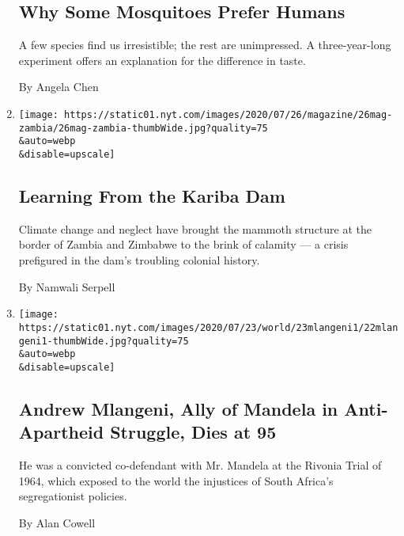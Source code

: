 \begin{enumerate}
  \hypertarget{why-some-mosquitoes-prefer-humans}{%
  \subsection{Why Some Mosquitoes Prefer
  Humans}\label{why-some-mosquitoes-prefer-humans}}

  A few species find us irresistible; the rest are unimpressed. A
  three-year-long experiment offers an explanation for the difference in
  taste.

  By Angela Chen
\item
  \href{/interactive/2020/07/22/magazine/zambia-kariba-dam.html}{}

  \texttt{[image: https://static01.nyt.com/images/2020/07/26/magazine/26mag-zambia/26mag-zambia-thumbWide.jpg?quality=75\\\&auto=webp\\\&disable=upscale]}

  \hypertarget{learning-from-the-kariba-dam}{%
  \subsection{Learning From the Kariba
  Dam}\label{learning-from-the-kariba-dam}}

  Climate change and neglect have brought the mammoth structure at the
  border of Zambia and Zimbabwe to the brink of calamity --- a crisis
  prefigured in the dam's troubling colonial history.

  By Namwali Serpell
\item
  \href{/2020/07/22/world/africa/andrew-mlangeni-dead.html}{}

  \texttt{[image: https://static01.nyt.com/images/2020/07/23/world/23mlangeni1/22mlangeni1-thumbWide.jpg?quality=75\\\&auto=webp\\\&disable=upscale]}

  \hypertarget{andrew-mlangeni-ally-of-mandela-in-anti-apartheid-struggle-dies-at-95}{%
  \subsection{Andrew Mlangeni, Ally of Mandela in Anti-Apartheid
  Struggle, Dies at
  95}\label{andrew-mlangeni-ally-of-mandela-in-anti-apartheid-struggle-dies-at-95}}

  He was a convicted co-defendant with Mr. Mandela at the Rivonia Trial
  of 1964, which exposed to the world the injustices of South Africa's
  segregationist policies.

  By Alan Cowell
\end{enumerate}


